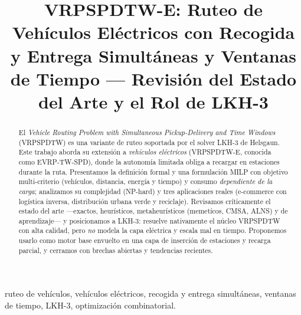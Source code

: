 \documentclass[conference]{IEEEtran}
\begin{document}
\title{VRPSPDTW-E: Ruteo de Veh\'iculos El\'ectricos con Recogida y Entrega
Simult\'aneas y Ventanas de Tiempo --- Revisi\'on del Estado del Arte y el Rol de LKH-3}

\author{
}

\maketitle

\begin{abstract}
El \emph{Vehicle Routing Problem with Simultaneous Pickup-Delivery and Time
Windows} (VRPSPDTW) es una variante de ruteo soportada por el solver LKH-3 de
Helsgaun. Este trabajo aborda su extensi\'on a \emph{veh\'iculos el\'ectricos}
(VRPSPDTW-E, conocida como EVRP-TW-SPD), donde la autonom\'ia limitada obliga a
recargar en estaciones durante la ruta. Presentamos la definici\'on formal y una
formulaci\'on MILP con objetivo multi-criterio (veh\'iculos, distancia, energ\'ia
y tiempo) y consumo \emph{dependiente de la carga}; analizamos su complejidad
(NP-hard) y tres aplicaciones reales (e-commerce con log\'istica inversa,
distribuci\'on urbana verde y reciclaje). Revisamos cr\'iticamente el estado del
arte ---exactos, heur\'isticos, metaheur\'isticos (memet\'icos, CMSA, ALNS) y de
aprendizaje--- y posicionamos a LKH-3: resuelve nativamente el n\'ucleo VRPSPDTW
con alta calidad, pero \emph{no} modela la capa el\'ectrica y escala mal en
tiempo. Proponemos usarlo como motor base envuelto en una capa de inserci\'on de
estaciones y recarga parcial, y cerramos con brechas abiertas y tendencias
recientes.
\end{abstract}

\begin{IEEEkeywords}
ruteo de veh\'iculos, veh\'iculos el\'ectricos, recogida y entrega
simult\'aneas, ventanas de tiempo, LKH-3, optimizaci\'on combinatorial.
\end{IEEEkeywords}

\end{document}
